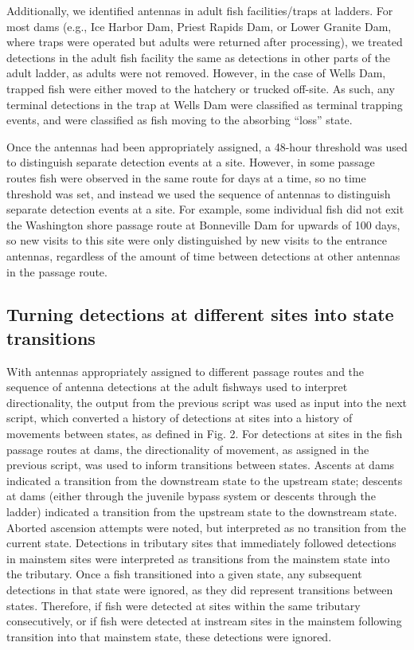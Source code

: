 \documentclass[
  12pt,
]{report}
\begin{document}
Additionally, we identified antennas in adult fish facilities/traps at
ladders. For most dams (e.g., Ice Harbor Dam, Priest Rapids Dam, or
Lower Granite Dam, where traps were operated but adults were returned
after processing), we treated detections in the adult fish facility the
same as detections in other parts of the adult ladder, as adults were
not removed. However, in the case of Wells Dam, trapped fish were either
moved to the hatchery or trucked off-site. As such, any terminal
detections in the trap at Wells Dam were classified as terminal trapping
events, and were classified as fish moving to the absorbing ``loss''
state.

Once the antennas had been appropriately assigned, a 48-hour threshold
was used to distinguish separate detection events at a site. However, in
some passage routes fish were observed in the same route for days at a
time, so no time threshold was set, and instead we used the sequence of
antennas to distinguish separate detection events at a site. For
example, some individual fish did not exit the Washington shore passage
route at Bonneville Dam for upwards of 100 days, so new visits to this
site were only distinguished by new visits to the entrance antennas,
regardless of the amount of time between detections at other antennas in
the passage route.

\hypertarget{turning-detections-at-different-sites-into-state-transitions}{%
\subsection{Turning detections at different sites into state
transitions}\label{turning-detections-at-different-sites-into-state-transitions}}

With antennas appropriately assigned to different passage routes and the
sequence of antenna detections at the adult fishways used to interpret
directionality, the output from the previous script was used as input
into the next script, which converted a history of detections at sites
into a history of movements between states, as defined in Fig. 2. For
detections at sites in the fish passage routes at dams, the
directionality of movement, as assigned in the previous script, was used
to inform transitions between states. Ascents at dams indicated a
transition from the downstream state to the upstream state; descents at
dams (either through the juvenile bypass system or descents through the
ladder) indicated a transition from the upstream state to the downstream
state. Aborted ascension attempts were noted, but interpreted as no
transition from the current state. Detections in tributary sites that
immediately followed detections in mainstem sites were interpreted as
transitions from the mainstem state into the tributary. Once a fish
transitioned into a given state, any subsequent detections in that state
were ignored, as they did represent transitions between states.
Therefore, if fish were detected at sites within the same tributary
consecutively, or if fish were detected at instream sites in the
mainstem following transition into that mainstem state, these detections
were ignored.
\end{document}
